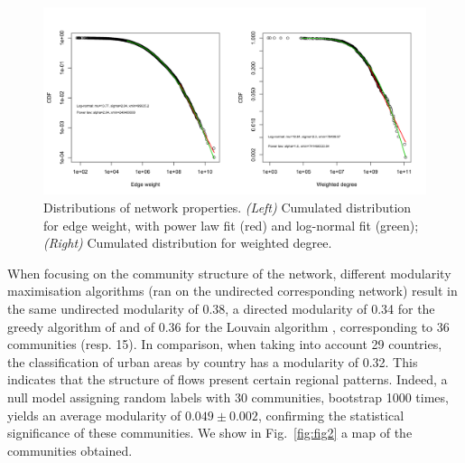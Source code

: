 \documentclass[10pt,letterpaper]{article}
\begin{document}
\begin{figure}
    \begin{center}
        \includegraphics[width=\linewidth]{figures/Fig1.png}
    \end{center}
    \vspace{2cm}
    \caption{Distributions of network properties. \textit{(Left)} Cumulated distribution for edge weight, with power law fit (red) and log-normal fit (green); \textit{(Right)} Cumulated distribution for weighted degree.}
    \label{fig:nwdist}
\end{figure}


When focusing on the community structure of the network, different modularity maximisation algorithms (ran on the undirected corresponding network) result in the same undirected modularity of 0.38, a directed modularity \cite{nicosia2009extending} of 0.34 for the greedy algorithm of \cite{clauset2004finding} and of 0.36 for the Louvain algorithm \cite{blondel2008fast}, corresponding to 36 communities (resp. 15). In comparison, when taking into account 29 countries, the classification of urban areas by country has a modularity of 0.32. This indicates that the structure of flows present certain regional patterns. Indeed, a null model assigning random labels with 30 communities, bootstrap 1000 times, yields an average modularity of $0.049 \pm 0.002$, confirming the statistical significance of these communities. We show in Fig.~\ref{fig:fig2} a map of the communities obtained.
\end{document}
